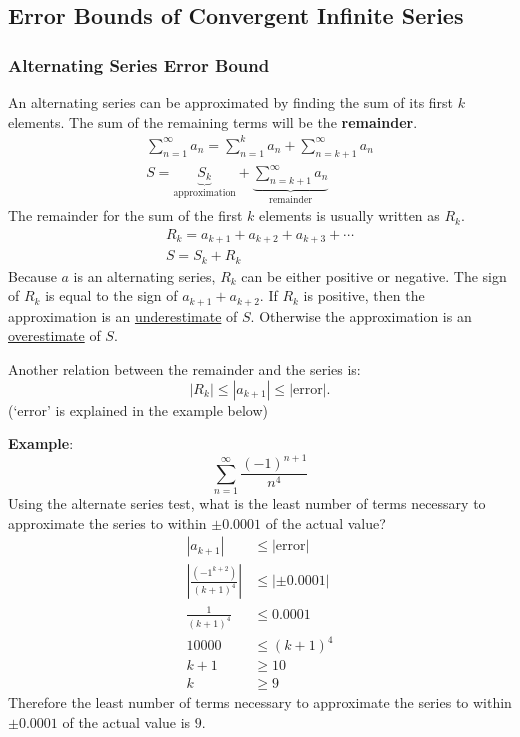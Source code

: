 \documentclass[12pt]{article}
\begin{document}
\subsection{Error Bounds of Convergent Infinite Series}
\subsubsection{Alternating Series Error Bound}
An alternating series can be approximated by finding the sum of its first $k$ elements. The sum of the remaining terms will be the \textbf{remainder}.
\begin{gather*}
	\sum_{n=1}^\infty a_n = \sum_{n=1}^k a_n + \sum_{n=k+1}^\infty a_n \\[10pt]
	S = \underbrace{S_k}_{\text{approximation}} + \underbrace{\sum_{n=k+1}^\infty a_n}_{\text{remainder}}
\end{gather*}
The remainder for the sum of the first $k$ elements is usually written as $R_k$.
\begin{gather*}
	R_k = a_{k+1} + a_{k+2} + a_{k+3} + \cdots \\
	S = S_k + R_k
\end{gather*}
Because $a$ is an alternating series, $R_k$ can be either positive or negative. The sign of $R_k$ is equal to the sign of $a_{k+1} + a_{k+2}$. If $R_k$ is positive, then the approximation is an \underline{underestimate} of $S$. Otherwise the approximation is an \underline{overestimate} of $S$.

\noindent Another relation between the remainder and the series is:
\[ |R_k| \le |a_{k+1}| \le |\text{error}|. \]
(`error' is explained in the example below)

\noindent \textbf{Example}:
\[ \sum_{n=1}^\infty \frac{(-1)^{n+1}}{n^4} \]
Using the alternate series test, what is the least number of terms necessary to approximate the series to within $\pm 0.0001$ of the actual value?
\begin{align*}
	|a_{k+1}|                                 & \le |\text{error}| \\[6pt]
	\left| \frac{(-1^{k+2})}{(k+1)^4} \right| & \le |\pm 0.0001|   \\[6pt]
	\frac{1}{(k+1)^4}                         & \le 0.0001         \\[6pt]
	10000                                     & \le (k+1)^4        \\
	k+1                                       & \ge 10             \\
	k                                         & \ge 9
\end{align*}
Therefore the least number of terms necessary to approximate the series to within $\pm 0.0001$ of the actual value is $9$.
\end{document}
